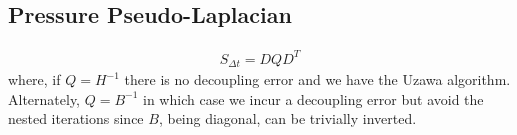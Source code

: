 \documentclass{kthreport}
\begin{document}
\subsection{Pressure Pseudo-Laplacian}

\begin{eqnarray}
	S_{\Delta t} = D QD^{T} \label{eqn:pressure_pseudo_laplacian}
\end{eqnarray}
where, if $Q=H^{-1}$ there is no decoupling error and we have the Uzawa algorithm. Alternately, $Q=B^{-1}$ in which case we incur a decoupling error but avoid the nested iterations since $B$, being diagonal, can be trivially inverted. 





\FloatBarrier



\end{document}
